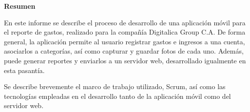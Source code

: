 \setcounter{page}{3}
\begin{center}
	{\bf Resumen}  %
\end{center}	

En este informe se describe el proceso de desarrollo de una aplicación móvil para el reporte de gastos, realizado para la compañía Digitalica Group C.A. De forma general, la aplicación permite al usuario registrar gastos e ingresos a una cuenta, asociarlos a categorías, así como capturar y guardar fotos de cada uno. Además, puede generar reportes y enviarlos a un servidor web, desarrollado igualmente en esta pasantía. 

Se describe brevemente el marco de trabajo utilizado, Scrum, así como las tecnologías empleadas en el desarrollo tanto de la aplicación móvil como del servidor web.


